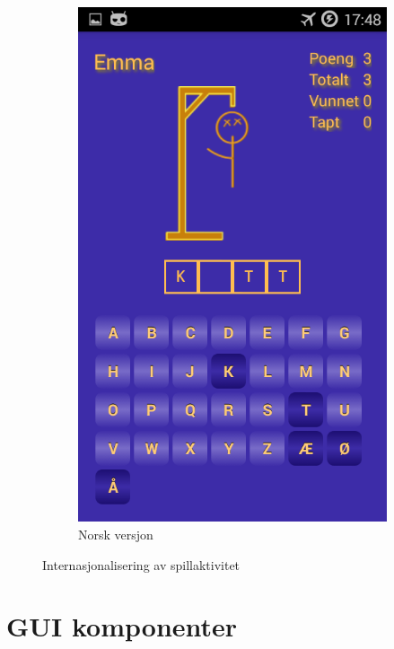 \begin{figure}[ht]
\begin{subfigure}[b]{0.3\textwidth}
        \includegraphics[width=\textwidth]{./img/losninger/2.png}
        \caption{Norsk versjon}
        \label{fig:aktivitet_norsk}
    \end{subfigure}
    \caption{Internasjonalisering av spillaktivitet}
    \label{fig:aktiviteter_spill_internasjonalisering}
\end{figure}



\section{GUI komponenter}

